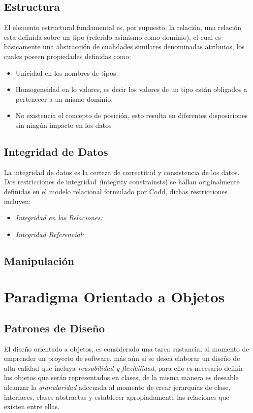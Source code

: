 \subsection {Estructura}
\noindent El elemento estructural fundamental es, por supuesto, la relación, una relación esta definida sobre un tipo
\noindent (referido asimismo como dominio), el cual es básicamente una abstracción de cualidades similares denominadas atributos,
\noindent los cuales poseen propiedades definidas como:
\begin{itemize}
    \item Unicidad en los nombres de tipos
    \item Homogeneidad en lo valores, es decir los valores de un tipo están obligados a pertenecer a un mismo dominio.
    \item No existencia el concepto de posición, esto resulta en diferentes disposiciones sin ningún impacto en los datos
\end{itemize}
\subsection{Integridad de Datos}
\noindent La integridad de datos es la certeza de correctitud y consistencia de los datos.\\
\noindent Dos restricciones de integridad \textit(integrity constrainsts) se hallan originalmente definidas en el modelo relacional
\noindent formulado por Codd, dichas restricciones incluyen:
\begin{itemize}
    \item \textit {Integridad en las Relaciones:}
    \item \textit {Integridad Referencial:}
\end{itemize}
\subsection {Manipulación}
\section {Paradigma Orientado a Objetos}
\subsection {Patrones de Diseño}
\noindent El diseño orientado a objetos, es considerado una tarea sustancial al momento de emprender un proyecto de software,
\noindent más aún si se desea elaborar un diseño de alta calidad que incluya \textit{reusabilidad y flexibilidad}, para ello es necesario
\noindent definir los objetos que serán representados en clases, de la misma manera es deseable alcanzar la \textit{granularidad}
\noindent adecuada al momento de crear jerarquías de clase, interfaces, clases abstractas y establecer apropiadamente las relaciones
\noindent que existen entre ellas.\\
